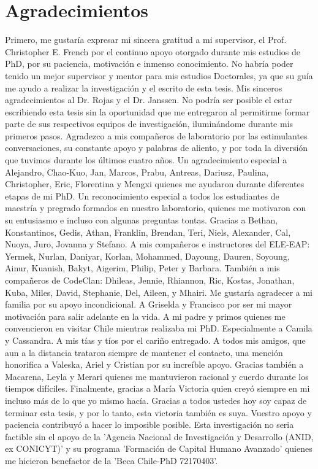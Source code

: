 \chapter{Agradecimientos}
\addtolength{\topmargin}{-.875in}
\addtolength{\textheight}{1.75in}
Primero, me gustaría expresar mi sincera gratitud a mi supervisor, el Prof. Christopher E. French por el continuo apoyo otorgado durante mis estudios de PhD, por su paciencia, motivación e inmenso conocimiento. No habría poder tenido un mejor supervisor y mentor para mis estudios Doctorales, ya que su guía me ayudo a realizar la investigación y el escrito de esta tesis.
Mis sinceros agradecimientos al Dr. Rojas y el Dr. Janssen. No podría ser posible el estar escribiendo esta tesis sin la oportunidad que me entregaron al permitirme formar parte de sus respectivos equipos de investigación, iluminándome durante mis primeros pasos.
Agradezco a mis compañeros de laboratorio por las estimulantes conversaciones, su constante apoyo y palabras de aliento, y por toda la diversión que tuvimos durante los últimos cuatro años. Un agradecimiento especial a Alejandro, Chao-Kuo, Jan, Marcos, Prabu, Antreas, Dariusz, Paulina, Christopher, Eric, Florentina y Mengxi quienes me ayudaron durante diferentes etapas de mi PhD. Un reconocimiento especial a todos los estudiantes de maestría y pregrado formados en nuestro laboratorio, quienes me motivaron con su entusiasmo e incluso con algunas preguntas tontas. Gracias a Bethan, Konstantinos, Gedis, Athan, Franklin, Brendan, Teri, Niels, Alexander, Cal, Nuoya, Juro, Jovanna y Stefano. 
A mis compañeros e instructores del ELE-EAP: Yermek, Nurlan, Daniyar, Korlan, Mohammed, Dayoung, Dauren, Soyoung, Ainur, Kuanish, Bakyt, Aigerim, Philip, Peter y Barbara. También a mis compañeros de CodeClan: Dhileas, Jennie, Rhiannon, Ric, Kostas, Jonathan, Kuba, Miles, David, Stephanie, Del, Aileen, y Mhairi.
Me gustaría agradecer a mi familia por su apoyo incondicional. A Griselda y Francisco por ser mi mayor motivación para salir adelante en la vida. A mi padre y primos quienes me convencieron en visitar Chile mientras realizaba mi PhD. Especialmente a Camila y Cassandra. A mis tías y tíos por el cariño entregado. A todos mis amigos, que aun a la distancia trataron siempre de mantener el contacto, una mención honorifica a Valeska, Ariel y Cristian por su increíble apoyo. Gracias también a Macarena, Leyla y Merari quienes me mantuvieron racional y cuerdo durante los tiempos difíciles. Finalmente, gracias a María Victoria quien creyó siempre en mi incluso más de lo que yo mismo hacía. Gracias a todos ustedes hoy soy capaz de terminar esta tesis, y por lo tanto, esta victoria también es suya. Vuestro apoyo y paciencia contribuyó a hacer lo imposible posible.
Esta investigación no seria factible sin el apoyo de la 'Agencia Nacional de Investigación y Desarrollo (ANID, ex CONICYT)' y su programa 'Formación de Capital Humano Avanzado' quienes me hicieron benefactor de la 'Beca Chile-PhD 72170403'.
